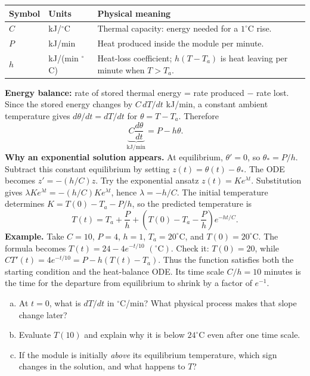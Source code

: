 \documentclass[10pt,letterpaper]{article}
\newcommand{\work}[1]{\vspace{#1}}
\begin{document}
\begin{center}
\end{center}

\begin{tabularx}{\linewidth}{@{}p{0.69in}p{1.65in}Y@{}}
\toprule
Symbol & Units & Physical meaning\\
\midrule
$C$ & kJ/$^\circ$C & Thermal capacity: energy needed for a $1^\circ$C rise.\\
$P$ & kJ/min & Heat produced inside the module per minute.\\
$h$ & kJ/(min $^\circ$C) & Heat-loss coefficient; $h(T-T_a)$ is heat leaving per minute when $T>T_a$.\\
\bottomrule
\end{tabularx}

\textbf{Energy balance:} rate of stored thermal energy = rate produced $-$ rate lost. Since the stored energy changes by $C\,dT/dt$ kJ/min, a constant ambient temperature gives $d\theta/dt=dT/dt$ for $\theta=T-T_a$. Therefore
\[
\underbrace{C\frac{d\theta}{dt}}_{\text{kJ/min}}=P-h\theta.
\]\newpage
\textbf{Why an exponential solution appears.} At equilibrium, $\theta'=0$, so $\theta_*=P/h$. Subtract this constant equilibrium by setting $z(t)=\theta(t)-\theta_*$. The ODE becomes $z'=-(h/C)z$. Try the exponential ansatz $z(t)=Ke^{\lambda t}$. Substitution gives $\lambda K e^{\lambda t}=-(h/C)K e^{\lambda t}$, hence $\lambda=-h/C$. The initial temperature determines $K=T(0)-T_a-P/h$, so the predicted temperature is
\[
\boxed{T(t)=T_a+\frac{P}{h}+\left(T(0)-T_a-\frac{P}{h}\right)e^{-ht/C}.}
\]
\textbf{ Example.} Take $C=10$, $P=4$, $h=1$, $T_a=20^\circ$C, and $T(0)=20^\circ$C. The formula becomes $T(t)=24-4e^{-t/10}$ $({}^\circ\mathrm C)$. Check it: $T(0)=20$, while $C T'(t)=4e^{-t/10}=P-h(T(t)-T_a)$. Thus the function satisfies both the starting condition and the heat-balance ODE. Its time scale $C/h=10$ minutes is the time for the departure from equilibrium to shrink by a factor of $e^{-1}$.

\begin{enumerate}[a.,leftmargin=*]
\item At $t=0$, what is $dT/dt$ in $^\circ$C/min? What physical process makes that slope change later?\work{0.30in}
\item Evaluate $T(10)$ and explain why it is below $24^\circ$C even after one time scale.\work{0.30in}
\item If the module is initially \emph{above} its equilibrium temperature, which sign changes in the solution, and what happens to $T$?\work{0.27in}
\end{enumerate}
\end{document}
